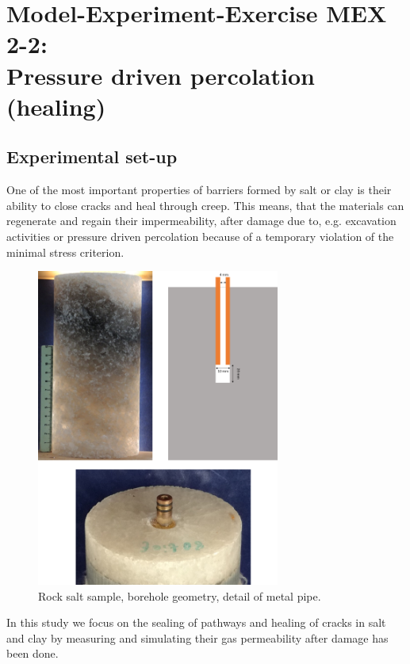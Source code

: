 \section[MEX 2-2: Pressure driven percolation (healing)]{Model-Experiment-Exercise MEX 2-2:\\Pressure driven percolation (healing)}
\label{sec:mex03}
\subsection{Experimental set-up}
One of the most important properties of barriers formed by salt or clay is their ability to close cracks and heal through creep. This means, that the materials can regenerate and regain their impermeability, after damage due to, e.g. excavation activities or  pressure driven percolation because of a temporary violation of the minimal stress criterion.

\begin{figure}[!ht]
\centering
\includegraphics[width=8cm]{figures/mex3-exper-setup.png}
\caption{Rock salt sample, borehole geometry, detail of metal pipe.}
\label{fig:ME3-exper-setup}
\end{figure}

In this study we focus on the sealing of pathways and healing of cracks in salt and clay by measuring and simulating their gas permeability after damage has been done. 


